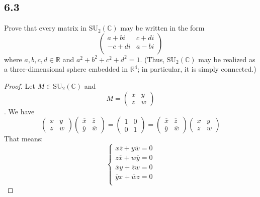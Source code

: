 \documentclass[a4paper, pdf, 12pt]{article}
\begin{document}
  \subsection*{6.3}
  Prove that every matrix in $\mbox{SU}_2(\mathbb{C})$ may be written in the form
  $$
  \begin{pmatrix}
    a + bi & c + di \\
    -c + di & a - bi\\
  \end{pmatrix}
  $$
where $a, b, c, d \in \mathbb{R}$ and $a^2 + b^2 + c^2 + d^2 = 1$. (Thus, $\mbox{SU}_2(\mathbb{C})$ may be realized as
a three-dimensional sphere embedded in $\mathbb{R}^{4}$; in particular, it is simply connected.)

\begin{proof}
  Let $M\in \mbox{SU}_{2}(\mathbb{C})$ and 
  $$
  M = \begin{pmatrix}
    x & y \\
    z & w
  \end{pmatrix}
  $$. We have $$
    \begin{pmatrix}
      x & y\\
      z & w
    \end{pmatrix}
    \begin{pmatrix}
      \overline{x} & \overline{z}\\
      \overline{y} & \overline{w}
    \end{pmatrix} = \begin{pmatrix}
      1 & 0\\
      0 & 1
    \end{pmatrix}
    = \begin{pmatrix}
      \overline{x} & \overline{z}\\
      \overline{y} & \overline{w}
    \end{pmatrix}
    \begin{pmatrix}
      x & y\\
      z & w
    \end{pmatrix}
  $$
  That means: $$
  \begin{cases}
    x\overline{z} + y\overline{w} = 0 \\
    z\overline{x} + w\overline{y} = 0 \\
    \overline{x}y + \overline{z}w = 0 \\
    \overline{y}x + \overline{w}z = 0 \\
  \end{cases}
  $$
\end{proof}
\end{document}
